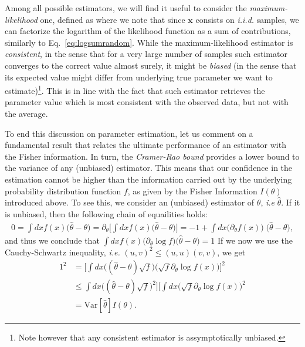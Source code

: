 Among all possible estimators, we will find it useful to consider the \textit{maximum-likelihood} one, defined as
where we note that since $\bm{x}$ consists on \textit{i.i.d.} samples, we can factorize the logarithm of the likelihood function as a sum of contributions, similarly to Eq.~\ref{eq:logsumrandom}. While the maximum-likelihood estimator is \textit{consistent}, in the sense that for a very large number of samples such estimator converges to the correct value almost surely, it might be \textit{biased} (in the sense that its expected value might differ from underlying true parameter we want to estimate)\footnote{Note however that any consistent estimator is assymptotically unbiased.}. This is in line with the fact that such estimator retrieves the parameter value which is most consistent with the observed data, but not with the average.

To end this discussion on parameter estimation, let us comment on a fundamental result that relates the ultimate performance of an estimator with the Fisher information. In turn, the \textit{Cramer-Rao bound} provides a lower bound to the variance of any (unbiased) estimator. This means that our confidence in the estimation cannot be higher than the information carried out by the underlying probability distribution function $f$, as given by the Fisher Information $I(\theta)$ introduced above. To see this, we consider an (unbiased) estimator of $\theta$, \textit{i.e} $\hat{\theta}$. If it is unbiased, then the following chain of equailities holds:
\begin{align*}
0 = \int dx f(x) \big(\hat{\theta}-\theta ) = \partial_\theta \Big[ \int dx f(x) \big(\hat{\theta}-\theta ) \Big] = -1 + \int dx \big(\partial_\theta f(x)\big)\; \big(\hat{\theta}-\theta ),
\end{align*}
and thus we conclude that $\int dx f(x) \big(\partial_\theta \log{f}\big) \big(\hat{\theta}-\theta) = 1$
If we now we use the Cauchy-Schwartz inequality, \textit{i.e.} $(u,v)^2 \leq (u,u) (v,v)$, we get
\begin{align*}
1^2 &= \Big[\int dx \Big((\hat{\theta}-\theta) \sqrt{f} \Big) \Big( \sqrt{f} \partial_\theta \log f(x) \Big) \Big]^2\\
&\leq \int dx \Big((\hat{\theta}-\theta) \sqrt{f} \Big)^2 \Big] \Big[ \int dx \Big( \sqrt{f} \partial_\theta \log f(x) \Big)^2 \\
&=  \text{Var}[\hat{\theta}] I(\theta).
\end{align*}

